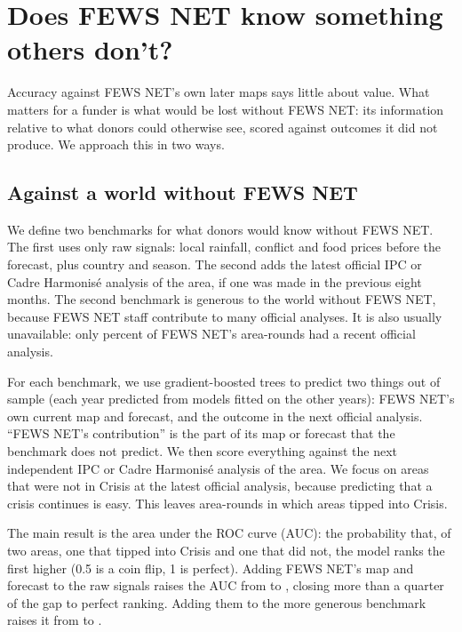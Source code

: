 \documentclass[11pt]{article}
\begin{document}
\FloatBarrier
\section{Does FEWS NET know something others don't?}\label{sec:value}

Accuracy against FEWS NET's own later maps says little about value. What matters for a funder is what would be lost without FEWS NET: its information relative to what donors could otherwise see, scored against outcomes it did not produce. We approach this in two ways.

\subsection{Against a world without FEWS NET}

We define two benchmarks for what donors would know without FEWS NET. The first uses only raw signals: local rainfall, conflict and food prices before the forecast, plus country and season. The second adds the latest official IPC or Cadre Harmonis\'e analysis of the area, if one was made in the previous eight months. The second benchmark is generous to the world without FEWS NET, because FEWS NET staff contribute to many official analyses. It is also usually unavailable: only \shareWithIndependent{} percent of FEWS NET's area-rounds had a recent official analysis.

For each benchmark, we use gradient-boosted trees to predict two things out of sample (each year predicted from models fitted on the other years): FEWS NET's own current map and forecast, and the outcome in the next official analysis. ``FEWS NET's contribution'' is the part of its map or forecast that the benchmark does not predict. We then score everything against the next independent IPC or Cadre Harmonis\'e analysis of the area. We focus on areas that were not in Crisis at the latest official analysis, because predicting that a crisis continues is easy. This leaves \aucN{} area-rounds in which \aucEvents{} areas tipped into Crisis.

The main result is the area under the ROC curve (AUC): the probability that, of two areas, one that tipped into Crisis and one that did not, the model ranks the first higher (0.5 is a coin flip, 1 is perfect). Adding FEWS NET's map and forecast to the raw signals raises the AUC from \aucRaw{} to \aucRawFews{}, closing more than a quarter of the gap to perfect ranking. Adding them to the more generous benchmark raises it from \aucRawIPC{} to \aucRawIPCFews{}.
\end{document}
